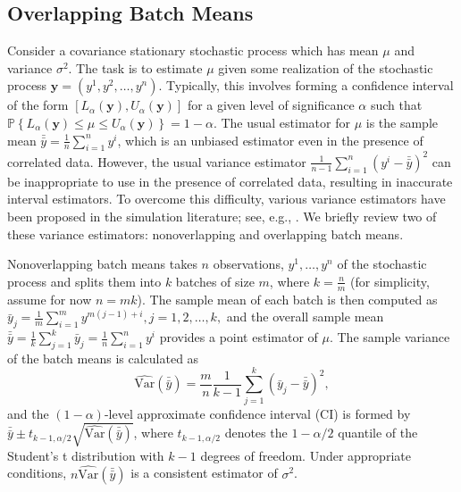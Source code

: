 \documentclass[12pt]{article}
\newcommand{\p}[1]{\mathbb{P} \left\{ #1 \right\}}
\newcommand{\varhat}{\widehat{\mathrm{Var}}}
\newcommand{\y}{\mathbf{y}}
\newcommand{\yb}{\bar{y}}
\newcommand{\ybb}{\bar{\yb}}
\begin{document}
\subsection{Overlapping Batch Means} \label{ssec:obm}
Consider a covariance stationary stochastic process which has mean $\mu$ and variance $\sigma^2$.  
The task is to estimate $\mu$ given some realization of the stochastic process $\y = (y^1, y^2, \dots, y^n)$.  
Typically, this involves forming a confidence interval of the form $[L_\alpha(\y), U_\alpha(\y)]$ for a given level of significance $\alpha$ such that $\p{L_\alpha(\y) \leq \mu \leq U_\alpha(\y)} = 1 - \alpha$.  
The usual estimator for $\mu$ is the sample mean $\ybb = \frac{1}{n} \sum_{i=1}^n y^i$, which is an unbiased estimator even in the presence of correlated data.  
However, the usual variance estimator $\frac{1}{n-1} \sum_{i=1}^n (y^i - \ybb)^2$ can be inappropriate to use in the presence of correlated data, resulting in inaccurate interval estimators.  
To overcome this difficulty, various variance estimators have been proposed in the simulation literature; see, e.g., \citep{law_07}.  
We briefly review two of these variance estimators: nonoverlapping and overlapping batch means.

Nonoverlapping batch means takes $n$ observations, $y^1, \dots, y^n$ of the stochastic process and splits them into $k$ batches of size $m$, where $k = \frac{n}{m}$ (for simplicity, assume for now $n = mk$).  
The sample mean of each batch is then computed as
$
	\yb_j = \frac{1}{m} \sum_{i=1}^{m} y^{m(j-1)+i}, j = 1,2, \dots, k,
$
and the overall sample mean $\ybb = \frac{1}{k} \sum_{j=1}^k \yb_j = \frac{1}{n} \sum_{i=1}^n y^i$ provides a point estimator of $\mu$.  
The sample variance of the batch means is calculated as
\begin{equation} \label{eq:var}
	\varhat(\ybb) = \frac{m}{n}\frac{1}{k-1} \sum_{j=1}^k \left( \yb_j - \ybb \right)^2,
\end{equation}
and the $(1-\alpha)$-level approximate confidence interval (CI) is formed by $\ybb \pm t_{k-1,\alpha/2} \sqrt{\varhat(\ybb)}$, where $t_{k-1,\alpha/2}$ denotes the $1-\alpha/2$ quantile of the Student's t distribution with $k-1$ degrees of freedom.  
Under appropriate conditions, $n\varhat(\ybb)$ is a consistent estimator of $\sigma^2$.
\end{document}
